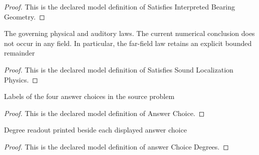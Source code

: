 \begin{proof}
  This is the declared model definition of Satisfies Interpreted Bearing Geometry.
\end{proof}
\begin{definition}
  \label{def:physics:phyx-mini-0308:phyxminiproblems-problemphyxmini0308-satisfiessoundlocalizationphysics}
  The governing physical and auditory laws. The current numerical conclusion does not occur in any field. In particular, the far-field law retains an explicit bounded remainder
\end{definition}
\begin{proof}
  This is the declared model definition of Satisfies Sound Localization Physics.
\end{proof}
\begin{definition}
  \label{def:physics:phyx-mini-0308:phyxminiproblems-problemphyxmini0308-answerchoice}
  Labels of the four answer choices in the source problem
\end{definition}
\begin{proof}
  This is the declared model definition of Answer Choice.
\end{proof}
\begin{definition}
  \label{def:physics:phyx-mini-0308:phyxminiproblems-problemphyxmini0308-answerchoicedegrees}
  Degree readout printed beside each displayed answer choice
\end{definition}
\begin{proof}
  This is the declared model definition of answer Choice Degrees.
\end{proof}
